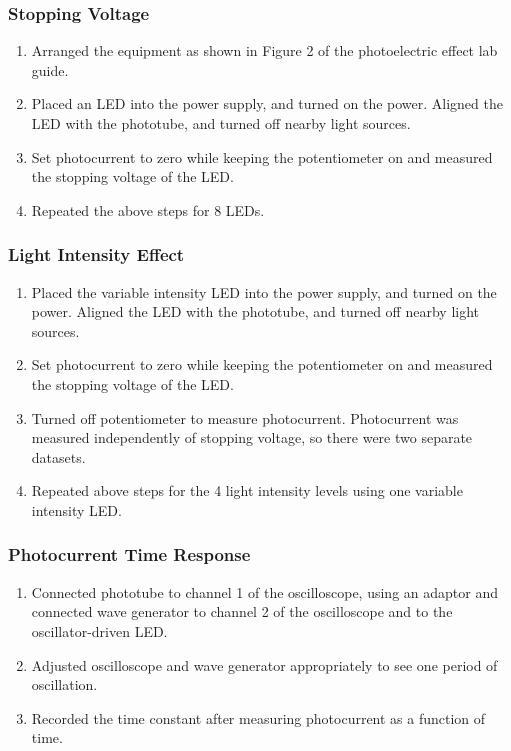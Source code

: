 \documentclass[a4paper, 11pt]{article}
\begin{document}
\subsubsection*{Stopping Voltage}
\begin{enumerate}
\item Arranged the equipment as shown in Figure 2 of the photoelectric effect lab guide.
\item Placed an LED into the power supply, and turned on the power. Aligned the LED with the phototube, and turned off nearby light sources.
\item Set photocurrent to zero while keeping the potentiometer on and measured the stopping voltage of the LED.
\item Repeated the above steps for 8 LEDs.
\end{enumerate}

\subsubsection*{Light Intensity Effect}
\begin{enumerate}
\item Placed the variable intensity LED into the power supply, and turned on the power. Aligned the LED with the phototube, and turned off nearby light sources.
\item Set photocurrent to zero while keeping the potentiometer on and measured the stopping voltage of the LED.
\item Turned off potentiometer to measure photocurrent. Photocurrent was measured independently of stopping voltage, so there were two separate datasets.
\item Repeated above steps for the 4 light intensity levels using one variable intensity LED.
\end{enumerate}

\subsubsection*{Photocurrent Time Response}
\begin{enumerate}
\item Connected phototube to channel 1 of the oscilloscope, using an adaptor and connected wave generator to channel 2 of the oscilloscope and to the oscillator-driven LED.
\item Adjusted oscilloscope and wave generator appropriately to see one period of oscillation.
\item Recorded the time constant after measuring photocurrent as a function of time.
\end{enumerate}
\end{document}
